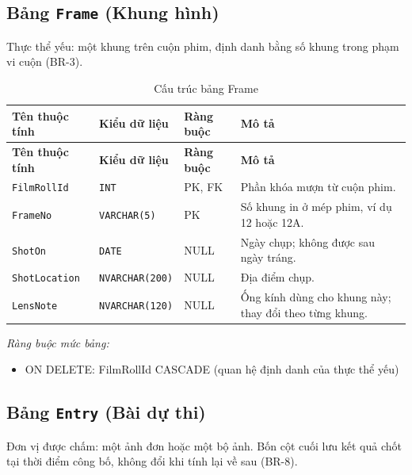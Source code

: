 \subsection{Bảng \texttt{Frame} (Khung hình)}

Thực thể yếu: một khung trên cuộn phim, định danh bằng số khung trong phạm vi cuộn (BR-3).

\begin{longtable}{|L{4cm}|L{3.15cm}|L{2.4cm}|L{4.55cm}|}
\caption{Cấu trúc bảng Frame} \\
\hline
\textbf{Tên thuộc tính} & \textbf{Kiểu dữ liệu} & \textbf{Ràng buộc} & \textbf{Mô tả} \\ \hline
\endfirsthead
\hline
\textbf{Tên thuộc tính} & \textbf{Kiểu dữ liệu} & \textbf{Ràng buộc} & \textbf{Mô tả} \\ \hline
\endhead
\texttt{FilmRollId} & \texttt{INT} & PK, FK & Phần khóa mượn từ cuộn phim. \\ \hline
\texttt{FrameNo} & \texttt{VARCHAR(5)} & PK & Số khung in ở mép phim, ví dụ 12 hoặc 12A. \\ \hline
\texttt{ShotOn} & \texttt{DATE} & NULL & Ngày chụp; không được sau ngày tráng. \\ \hline
\texttt{ShotLocation} & \texttt{NVARCHAR(200)} & NULL & Địa điểm chụp. \\ \hline
\texttt{LensNote} & \texttt{NVARCHAR(120)} & NULL & Ống kính dùng cho khung này; thay đổi theo từng khung. \\ \hline
\end{longtable}

\noindent\textit{Ràng buộc mức bảng:}

\begin{itemize}\raggedright
    \item ON DELETE: FilmRollId CASCADE (quan hệ định danh của thực thể yếu)
\end{itemize}

\subsection{Bảng \texttt{Entry} (Bài dự thi)}

Đơn vị được chấm: một ảnh đơn hoặc một bộ ảnh. Bốn cột cuối lưu kết quả chốt tại thời điểm công bố, không đổi khi tính lại về sau (BR-8).

